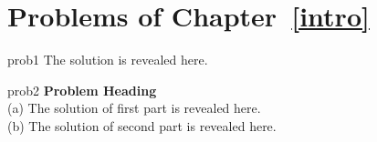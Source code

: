 

\section*{Problems of Chapter~\ref{intro}}

\begin{sol}{prob1}
The solution is revealed here.
\end{sol}


\begin{sol}{prob2}
\textbf{Problem Heading}\\
(a) The solution of first part is revealed here.\\
(b) The solution of second part is revealed here.
\end{sol}

